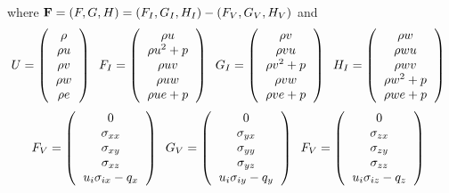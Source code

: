where ${\bf F} = (F,G,H) = (F_I,G_I,H_I) - (F_V,G_V,H_V)$ and
\begin{equation}
U = \l(
\begin{tabular}{c}
$\rho$\\
$\rho u$\\
$\rho v$\\
$\rho w$\\
$\rho e$
\end{tabular}
\r) \;\; 
F_I = \l(
\begin{tabular}{c}
$\rho u$\\
$\rho u^2 + p$\\
$\rho uv$\\
$\rho uw$\\
$\rho ue + p$
\end{tabular}
\r) \;\; 
G_I = \l(
\begin{tabular}{c}
$\rho v$\\
$\rho vu$\\
$\rho v^2 + p$\\
$\rho vw$\\
$\rho ve+p$
\end{tabular}
\r) \;\; 
H_I = \l(
\begin{tabular}{c}
$\rho w$\\
$\rho wu$\\
$\rho wv$\\
$\rho w^2 + p$\\
$\rho we + p$
\end{tabular}
\r) \;\; 
\end{equation}
\begin{equation}
F_V = \l(
\begin{tabular}{c}
$0$\\
$\sigma_{xx}$\\
$\sigma_{xy}$\\
$\sigma_{xz}$\\
$u_i\sigma_{ix}-q_x$
\end{tabular}
\r) \;\; 
G_V = \l(
\begin{tabular}{c}
$0$\\
$\sigma_{yx}$\\
$\sigma_{yy}$\\
$\sigma_{yz}$\\
$u_i\sigma_{iy}-q_y$
\end{tabular}
\r) \;\; 
F_V = \l(
\begin{tabular}{c}
$0$\\
$\sigma_{zx}$\\
$\sigma_{zy}$\\
$\sigma_{zz}$\\
$u_i\sigma_{iz}-q_z$
\end{tabular}
\r) \;\; 
\end{equation}

